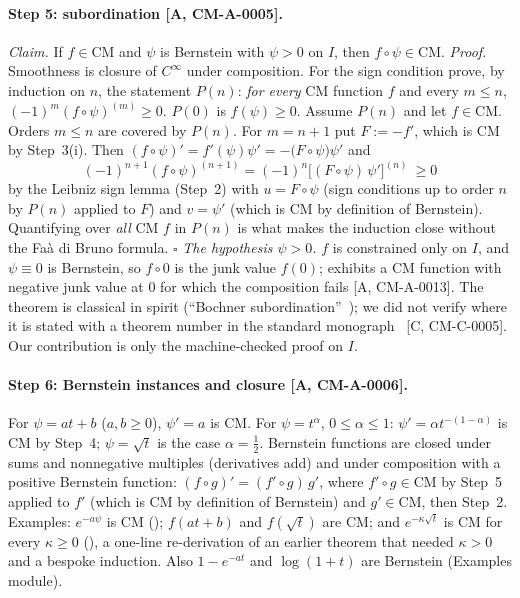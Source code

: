 \documentclass[10pt]{article}
\theoremstyle{remark}
\newcommand{\tier}[1]{\textsf{[#1]}}
\newcommand{\lean}[1]{\texttt{\detokenize{#1}}}
\newcommand{\CM}{\mathrm{CM}}
\begin{document}
\paragraph{Step 5: subordination \tier{A, CM-A-0005}.} \emph{Claim.} If $f\in\CM$ and $\psi$ is Bernstein with
$\psi>0$ on $I$, then $f\circ\psi\in\CM$.
\emph{Proof.} Smoothness is closure of $C^\infty$ under composition. For the sign condition prove, by induction on $n$, the
statement $P(n)$: \emph{for every} $\CM$ function $f$ and every $m\le n$, $(-1)^m(f\circ\psi)^{(m)}\ge0$. $P(0)$ is
$f(\psi)\ge0$. Assume $P(n)$ and let $f\in\CM$. Orders $m\le n$ are covered by $P(n)$. For $m=n+1$ put $F:=-f'$, which is
$\CM$ by Step~3(i). Then $(f\circ\psi)'=f'(\psi)\psi'=-\bigl(F\circ\psi\bigr)\psi'$ and
$$(-1)^{n+1}(f\circ\psi)^{(n+1)}=(-1)^n\bigl[(F\circ\psi)\,\psi'\bigr]^{(n)}\ \ge 0$$
by the Leibniz sign lemma (Step~2) with $u=F\circ\psi$ (sign conditions up to order $n$ by $P(n)$ applied to $F$) and
$v=\psi'$ (which is $\CM$ by definition of Bernstein). Quantifying over \emph{all} $\CM$ $f$ in $P(n)$ is what makes the
induction close without the Fa\`a di Bruno formula. $\square$
\emph{The hypothesis $\psi>0$.} $f$ is constrained only on $I$, and $\psi\equiv0$ is Bernstein, so $f\circ0$ is the junk
value $f(0)$; \lean{junk_comp_zero_not_cm} exhibits a $\CM$ function with negative junk value at $0$ for which the
composition fails \tier{A, CM-A-0013}. The theorem is classical in spirit (``Bochner subordination''~\cite{sal}); we did
not verify where it is stated with a theorem number in the standard monograph~\cite{ssv} \tier{C, CM-C-0005}. Our contribution
is only the machine-checked proof on $I$.



\paragraph{Step 6: Bernstein instances and closure \tier{A, CM-A-0006}.} For $\psi=at+b$ ($a,b\ge0$), $\psi'=a$ is
$\CM$. For $\psi=t^\alpha$, $0\le\alpha\le1$: $\psi'=\alpha t^{-(1-\alpha)}$ is $\CM$ by Step~4; $\psi=\sqrt t$ is the case
$\alpha=\tfrac12$. Bernstein functions are closed under sums and nonnegative multiples (derivatives add) and under
composition with a positive Bernstein function: $(f\circ g)'=(f'\circ g)\,g'$, where $f'\circ g\in\CM$ by Step~5 applied to
$f'$ (which is $\CM$ by definition of Bernstein) and $g'\in\CM$, then Step~2. Examples: $e^{-a\psi}$ is $\CM$ (\lean{exp_neg_comp}); $f(at+b)$
and $f(\sqrt t)$ are $\CM$; and $e^{-\kappa\sqrt t}$ is $\CM$ for every $\kappa\ge0$ (\lean{phi_cm}), a one-line
re-derivation of an earlier theorem that needed $\kappa>0$ and a bespoke induction. Also $1-e^{-at}$ and $\log(1+t)$
are Bernstein (Examples module).
\end{document}
